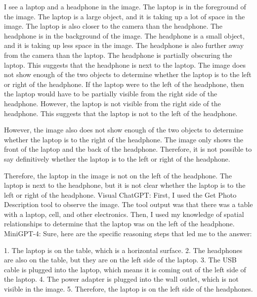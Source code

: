 \begin{enumerate}
    I see a laptop and a headphone in the image.
    The laptop is in the foreground of the image. The laptop is a large object, and it is taking up a lot of space in the image. The laptop is also closer to the camera than the headphone.
    The headphone is in the background of the image. The headphone is a small object, and it is taking up less space in the image. The headphone is also further away from the camera than the laptop.
    The headphone is partially obscuring the laptop. This suggests that the headphone is next to the laptop.
    The image does not show enough of the two objects to determine whether the laptop is to the left or right of the headphone.
    If the laptop were to the left of the headphone, then the laptop would have to be partially visible from the right side of the headphone. However, the laptop is not visible from the right side of the headphone. This suggests that the laptop is not to the left of the headphone.
    
    However, the image also does not show enough of the two objects to determine whether the laptop is to the right of the headphone. The image only shows the front of the laptop and the back of the headphone. Therefore, it is not possible to say definitively whether the laptop is to the left or right of the headphone.
    
    Therefore, the laptop in the image is not on the left of the headphone. The laptop is next to the headphone, but it is not clear whether the laptop is to the left or right of the headphone.
    \subitem Visual ChatGPT: First, I used the Get Photo Description tool to observe the image. The tool output was that there was a table with a laptop, cell, and other electronics. Then, I used my knowledge of spatial relationships to determine that the laptop was on the left of the headphone.
    \subitem MiniGPT-4: Sure, here are the specific reasoning steps that led me to the answer:

    1. The laptop is on the table, which is a horizontal surface.
    2. The headphones are also on the table, but they are on the left side of the laptop.
    3. The USB cable is plugged into the laptop, which means it is coming out of the left side of the laptop.
    4. The power adapter is plugged into the wall outlet, which is not visible in the image.
    5. Therefore, the laptop is on the left side of the headphones.
\end{enumerate}
